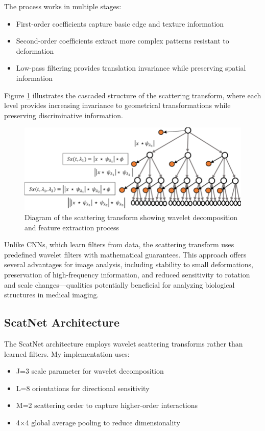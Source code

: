 \documentclass[10pt,twocolumn]{article}
\begin{document}
The process works in multiple stages:
\begin{itemize}
    \item First-order coefficients capture basic edge and texture information
    \item Second-order coefficients extract more complex patterns resistant to deformation
    \item Low-pass filtering provides translation invariance while preserving spatial information
\end{itemize}

Figure \ref{fig:scat_transform} illustrates the cascaded structure of the scattering transform, where each level provides increasing invariance to geometrical transformations while preserving discriminative information.

\begin{figure}[h]
\centering
\includegraphics[width=0.9\columnwidth]{imgs/scat_transform.png}
\caption{Diagram of the scattering transform showing wavelet decomposition and feature extraction process}
\label{fig:scat_transform}
\end{figure}

Unlike CNNs, which learn filters from data, the scattering transform uses predefined wavelet filters with mathematical guarantees. This approach offers several advantages for image analysis, including stability to small deformations, preservation of high-frequency information, and reduced sensitivity to rotation and scale changes—qualities potentially beneficial for analyzing biological structures in medical imaging.

\subsection{ScatNet Architecture}
The ScatNet architecture employs wavelet scattering transforms rather than learned filters. My implementation uses:
\begin{itemize}
    \item J=3 scale parameter for wavelet decomposition
    \item L=8 orientations for directional sensitivity
    \item M=2 scattering order to capture higher-order interactions
    \item 4×4 global average pooling to reduce dimensionality
\end{itemize}
\end{document}
